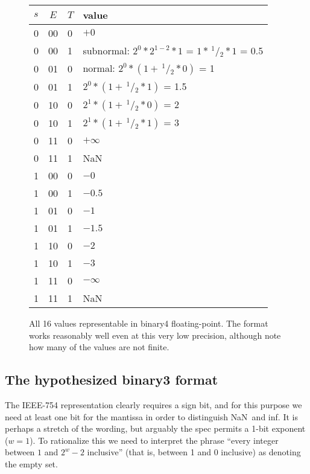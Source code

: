 \documentclass[twocolumn]{article}
\newcommand\sfrac[2]{\!{}\,^{#1}\!/{}\!_{#2}}
\newcommand\nan{\textsf{NaN}}
\renewcommand\inf{\textsf{inf}}
\begin{document}

\begin{figure}[h]
\begin{tabular}{|l@{\,}c@{\,}l|p{2.5in}|}
\hline
  $s$ & $E$ & $T$ & value \\
  \hline
0 & 00 & 0 &   $+0$ \\
0 & 00 & 1 &    subnormal: %
                $2^0 * 2^{1-2} * 1$ =
                $1 * \sfrac{1}{2} * 1$ = 0.5 \\
0 & 01 & 0 &    normal: %
                $2^0 * (1 + \sfrac{1}{2} * 0)$ = 1 \\
0 & 01 & 1 &    $2^0 * (1 + \sfrac{1}{2} * 1)$ = 1.5 \\
0 & 10 & 0 &    $2^1 * (1 + \sfrac{1}{2} * 0)$ = 2 \\
0 & 10 & 1 &    $2^1 * (1 + \sfrac{1}{2} * 1)$ = 3 \\
0 & 11 & 0 &   $+\infty$ \\
0 & 11 & 1 &    \nan \\
1 & 00 & 0 &   $-0$ \\
1 & 00 & 1 &   $-0.5$ \\
1 & 01 & 0 &   $-1$ \\ 
1 & 01 & 1 &   $-1.5$ \\
1 & 10 & 0 &   $-2$ \\
1 & 10 & 1 &   $-3$ \\ 
1 & 11 & 0 &   $-\infty$ \\
1 & 11 & 1 &    \nan \\
\hline
\end{tabular}
\caption{All 16 values representable in binary4 floating-point.
  The format works reasonably well even at this very low precision,
  although note how many of the values are not finite.} \label{fig:allvalues4}
\end{figure}


\subsection{The hypothesized binary3 format} \label{sec:binary3}
The IEEE-754 representation clearly requires a sign bit, and for this
purpose we need at least one bit for the mantissa in order to
distinguish \nan\ and \inf. It is perhaps a stretch of the wording,
but arguably the spec permits a 1-bit exponent ($w = 1$). To
rationalize this we need to interpret the phrase ``every integer
between $1$ and $2^w-2$ inclusive'' (that is, between 1 and 0 inclusive)
as denoting the empty set.
\end{document}
